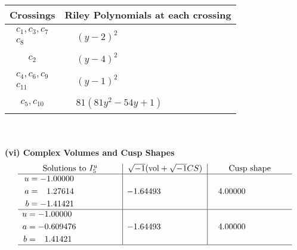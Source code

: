 \documentclass[1p]{elsarticle_modified}
\theoremstyle{definition}
\newcommand{\I}{\sqrt{-1}}
\begin{document}
\begin{tabular}{m{50pt}|m{274pt}}
Crossings & \hspace{64pt}Riley Polynomials at each crossing \\
\hline $$\begin{aligned}c_{1},c_{3},c_{7}\\c_{8}\end{aligned}$$&$\begin{aligned}
&(y-2)^2
\end{aligned}$\\
\hline $$\begin{aligned}c_{2}\end{aligned}$$&$\begin{aligned}
&(y-4)^2
\end{aligned}$\\
\hline $$\begin{aligned}c_{4},c_{6},c_{9}\\c_{11}\end{aligned}$$&$\begin{aligned}
&(y-1)^2
\end{aligned}$\\
\hline $$\begin{aligned}c_{5},c_{10}\end{aligned}$$&$\begin{aligned}
&81(81 y^2-54 y+1)
\end{aligned}$\\
\hline
\end{tabular}\\~\\
\newpage\flushleft \textbf{(vi) Complex Volumes and Cusp Shapes}
$$\begin{array}{c|c|c}  
\text{Solutions to }I^u_{5}& \I (\text{vol} + \sqrt{-1}CS) & \text{Cusp shape}\\
 \hline 
\begin{aligned}
u &= -1.00000\phantom{ +0.000000I} \\
a &= \phantom{-}1.27614\phantom{ +0.000000I} \\
b &= -1.41421\phantom{ +0.000000I}\end{aligned}
 & -1.64493\phantom{ +0.000000I} & \phantom{-}4.00000\phantom{ +0.000000I} \\ \hline\begin{aligned}
u &= -1.00000\phantom{ +0.000000I} \\
a &= -0.609476\phantom{ +0.000000I} \\
b &= \phantom{-}1.41421\phantom{ +0.000000I}\end{aligned}
 & -1.64493\phantom{ +0.000000I} & \phantom{-}4.00000\phantom{ +0.000000I}\\
 \hline 
 \end{array}$$\newpage
\end{document}
